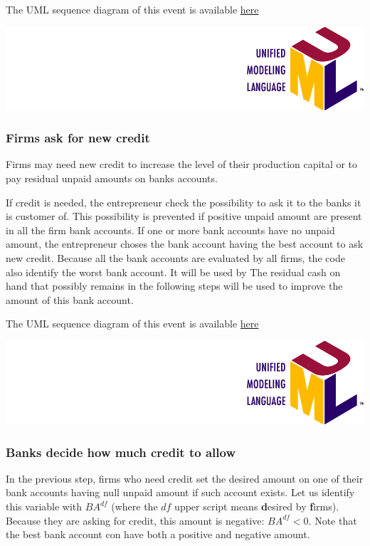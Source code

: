 \documentclass{book}
\newcommand{\umllocation}{file:///Users/giulioni/Dropbox/svn/sfcabm_my/documentation}
\begin{document}
The UML sequence diagram of this event is available \href{\umllocation/firms_payBackBankDebt.html}{here}
\begin{marginfigure}
	\includegraphics[scale=0.1]{uml.png}
\end{marginfigure}


\subsubsection{Firms ask for new credit}

Firms may need new credit to increase the level of their production capital or to pay residual unpaid amounts on banks accounts.

If credit is needed, the entrepreneur check the possibility to ask it to the banks it is customer of. This possibility is prevented if positive unpaid amount are present in all the firm bank accounts. If one or more bank accounts have no unpaid amount, the entrepreneur choses the bank account having the best account to ask new credit. Because all the bank accounts are evaluated by all firms, the code also identify the worst bank account. It will be used by The residual cash on hand that possibly remains in the following steps will be used to improve the amount of this bank account. 

The UML sequence diagram of this event is available \href{\umllocation/setDesiredCredit.html}{here}
\begin{marginfigure}
	\includegraphics[scale=0.1]{uml.png}
\end{marginfigure}

\subsubsection{Banks decide how much credit to allow}

In the previous step, firms who need credit set the desired amount on one of their bank accounts having null unpaid amount if such account exists. Let us identify this variable with $BA^{df}$ (where the $df$ upper script means \textbf desired by \textbf firms). Because they are asking for credit, this amount is negative:  $BA^{df}<0$. Note that the best bank account con have both a positive and negative amount. 
\end{document}
